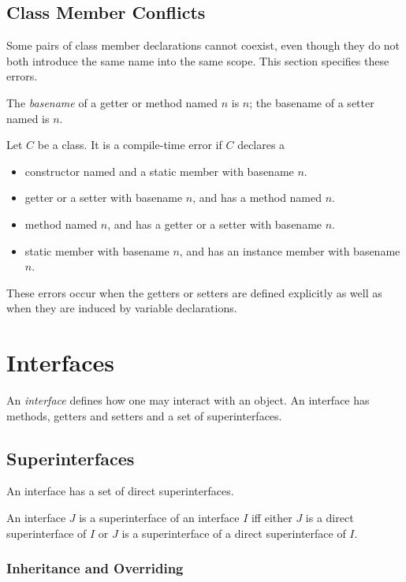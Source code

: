 \documentclass{article}
\begin{document}
\subsection{Class Member Conflicts}

Some pairs of class member declarations cannot coexist,
even though they do not both introduce the same name into the same scope.
This section specifies these errors.

The {\em basename} of a getter or method named $n$ is $n$;
the basename of a setter named  is $n$.

Let $C$ be a class.
It is a compile-time error if $C$ declares a
\begin{itemize}
\item constructor named  and a static member with basename $n$.
\item getter or a setter with basename $n$, and has a method named $n$.
\item method named $n$, and has a getter or a setter with basename $n$.
\item static member with basename $n$, and has an instance member with basename $n$.
\end{itemize}
These errors occur when the getters or setters are defined explicitly
as well as when they are induced by variable declarations.


\section{Interfaces}

\LMHash{}
An {\em interface} defines how one may interact with an object.
An interface has methods, getters and setters and a set of superinterfaces.


\subsection{Superinterfaces}

\LMHash{}
An interface has a set of direct superinterfaces.

\LMHash{}
An interface $J$ is a superinterface of an interface $I$ if{}f either $J$ is a direct superinterface of $I$ or $J$ is a superinterface of a direct superinterface of $I$.


\subsubsection{Inheritance and Overriding}
\end{document}
